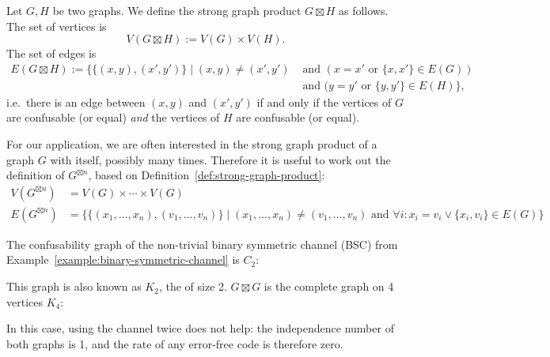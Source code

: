 \begin{definition}\label{def:strong-graph-product}
Let $G, H$ be two graphs. We define the strong graph product $G \boxtimes H$ as follows. The set of vertices is
\[
V(G \boxtimes H) := V(G) \times V(H).
\]
The set of edges is
\[
\begin{split}
E(G \boxtimes H) := \big\{\{(x,y),(x',y')\} \mid (x,y) \neq (x',y') &\mbox{ and }  (x = x' \mbox{ or } \{x,x'\} \in E(G))\\ 
&\mbox{ and } (y=y' \mbox{ or } \{y,y'\} \in E(H) \big\},
\end{split}
\]
i.e.\ there is an edge between $(x,y)$ and $(x',y')$ if and only if the vertices of $G$ are confusable (or equal) \emph{and} the vertices of $H$ are confusable (or equal).
\end{definition}
For our application, we are often interested in the strong graph product of a graph $G$ with itself, possibly many times. Therefore it is useful to work out the definition of $G^{\boxtimes n}$, based on Definition~\ref{def:strong-graph-product}:
\begin{align*}
V(G^{\boxtimes n}) &= V(G) \times \cdots \times V(G)\\
E(G^{\boxtimes n}) &= \big\{ \{(x_1, \ldots, x_n),(v_1, \ldots, v_n)\}  \mid (x_1, \ldots, x_n) \neq (v_1, \ldots, v_n) \mbox{ and } \forall i : x_i = v_i \vee \{x_i,v_i\} \in E(G)\}
\end{align*}



\begin{example}\label{example:bsc-graph}
The confusability graph of the non-trivial binary symmetric channel (BSC) from Example~\ref{example:binary-symmetric-channel} is $C_2$:
\begin{center}
\end{center}
This graph is also known as $K_2$, the  of size 2. $G \boxtimes G$ is the complete graph on 4 vertices $K_4$:
\begin{center}
\end{center}
In this case, using the channel twice does not help: the independence number of both graphs is 1, and the rate of any error-free code is therefore zero.
\end{example}

